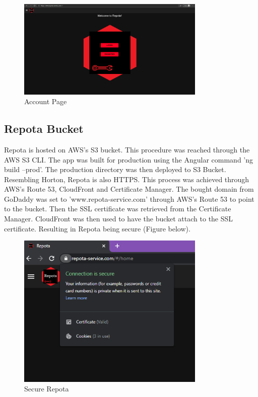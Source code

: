 \begin{figure}[H]
    \centering
    \caption{Account Page}
    \label{image:accountPage}
    \includegraphics[width=0.8\textwidth]{images/repota/UI/account.png}
\end{figure}

\subsection{Repota Bucket}
Repota is hosted on AWS's S3 bucket. This procedure was reached through the AWS S3 CLI. The app was built for production using the Angular command 'ng build --prod'. The production directory was then deployed to S3 Bucket. Resembling Horton, Repota is also HTTPS. This process was achieved through AWS's Route 53, CloudFront and Certificate Manager. The bought domain from GoDaddy was set to 'www.repota-service.com' through AWS's Route 53 to point to the bucket. Then the SSL certificate was retrieved from the Certificate Manager. CloudFront was then used to have the bucket attach to the SSL certificate. Resulting in Repota being secure (Figure below).

\begin{figure}[H]
    \centering
    \caption{Secure Repota}
    \label{image:secureRepota}
    \includegraphics[width=0.8\textwidth]{images/aws/secure_repota.png}
\end{figure}